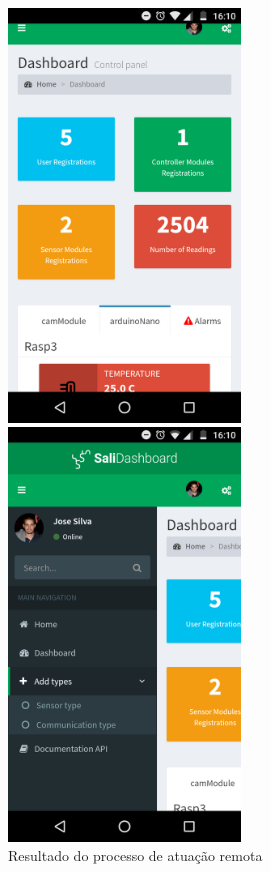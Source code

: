 \begin{figure}[h]
	\centering
	\begin{minipage}[b]{0.495\textwidth}
		\centering
		\includegraphics[width=0.55\textwidth]{img/mobileprint1.png}
	\end{minipage}
	\hfill
	\begin{minipage}[b]{0.495\textwidth}
		\centering
		\includegraphics[width=0.55\textwidth]{img/mobileprint2.png}
	\end{minipage}
	\caption{Resultado do processo de atuação remota}
			\label{responsiveinterface}
\end{figure}


